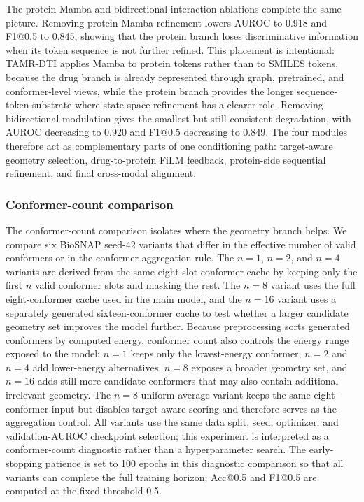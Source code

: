 The protein Mamba and bidirectional-interaction ablations complete the same picture. Removing protein Mamba refinement lowers AUROC to 0.918 and F1@0.5 to 0.845, showing that the protein branch loses discriminative information when its token sequence is not further refined. This placement is intentional: TAMR-DTI applies Mamba to protein tokens rather than to SMILES tokens, because the drug branch is already represented through graph, pretrained, and conformer-level views, while the protein branch provides the longer sequence-token substrate where state-space refinement has a clearer role. Removing bidirectional modulation gives the smallest but still consistent degradation, with AUROC decreasing to 0.920 and F1@0.5 decreasing to 0.849. The four modules therefore act as complementary parts of one conditioning path: target-aware geometry selection, drug-to-protein FiLM feedback, protein-side sequential refinement, and final cross-modal alignment.

\subsubsection{Conformer-count comparison}

The conformer-count comparison isolates where the geometry branch helps. We compare six BioSNAP seed-42 variants that differ in the effective number of valid conformers or in the conformer aggregation rule. The $n=1$, $n=2$, and $n=4$ variants are derived from the same eight-slot conformer cache by keeping only the first $n$ valid conformer slots and masking the rest. The $n=8$ variant uses the full eight-conformer cache used in the main model, and the $n=16$ variant uses a separately generated sixteen-conformer cache to test whether a larger candidate geometry set improves the model further. Because preprocessing sorts generated conformers by computed energy, conformer count also controls the energy range exposed to the model: $n=1$ keeps only the lowest-energy conformer, $n=2$ and $n=4$ add lower-energy alternatives, $n=8$ exposes a broader geometry set, and $n=16$ adds still more candidate conformers that may also contain additional irrelevant geometry. The $n=8$ uniform-average variant keeps the same eight-conformer input but disables target-aware scoring and therefore serves as the aggregation control. All variants use the same data split, seed, optimizer, and validation-AUROC checkpoint selection; this experiment is interpreted as a conformer-count diagnostic rather than a hyperparameter search. The early-stopping patience is set to 100 epochs in this diagnostic comparison so that all variants can complete the full training horizon; Acc@0.5 and F1@0.5 are computed at the fixed threshold 0.5.

